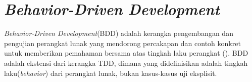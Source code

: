\section{\emph{Behavior-Driven Development}}

\emph{Behavior-Driven Development}(BDD) adalah kerangka pengembangan dan pengujian perangkat lunak
yang mendorong percakapan dan contoh konkret untuk memberikan pemahaman bersama atas tingkah laku
perangkat (\cite{dan_bdd}). BDD adalah ekstensi dari kerangka TDD, dimana yang didefinisikan adalah
tingkah laku(\emph{behavior}) dari perangkat lunak, bukan kasus-kasus uji eksplisit.


